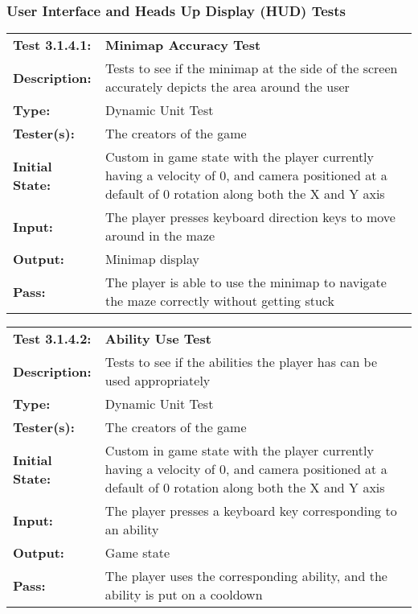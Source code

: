 \documentclass[12pt, titlepage]{article}
\begin{document}
\begin{enumerate}
\subsubsection{User Interface and Heads Up Display (HUD) Tests}
\begin{mdframed}[linewidth=1pt]
\begin{tabularx}{\textwidth}{@{}p{3cm}X@{}}
{\bf Test 3.1.4.1:} & {\bf Minimap Accuracy Test}\\[\baselineskip]
{\bf Description:} & Tests to see if the minimap at the side of the screen accurately depicts the area around the user\\[0.5\baselineskip]
{\bf Type:} & Dynamic Unit Test\\[0.5\baselineskip]
{\bf Tester(s):} & The creators of the game\\[0.5\baselineskip]
{\bf Initial State:} & Custom in game state with the player currently having a velocity of 0, and camera positioned at a default of 0 rotation along both the X and Y axis\\[0.5\baselineskip]
{\bf Input:} & The player presses keyboard direction keys to move around in the maze\\[0.5\baselineskip]
{\bf Output:} & Minimap display\\[0.5\baselineskip]
{\bf Pass:} & The player is able to use the minimap to navigate the maze correctly without getting stuck
\end{tabularx}
\end{mdframed}

\begin{mdframed}[linewidth=1pt]
\begin{tabularx}{\textwidth}{@{}p{3cm}X@{}}
{\bf Test 3.1.4.2:} & {\bf Ability Use Test}\\[\baselineskip]
{\bf Description:} & Tests to see if the abilities the player has can be used appropriately \\[0.5\baselineskip]
{\bf Type:} & Dynamic Unit Test\\[0.5\baselineskip]
{\bf Tester(s):} & The creators of the game\\[0.5\baselineskip]
{\bf Initial State:} & Custom in game state with the player currently having a velocity of 0, and camera positioned at a default of 0 rotation along both the X and Y axis\\[0.5\baselineskip]
{\bf Input:} & The player presses a keyboard key corresponding to an ability \\[0.5\baselineskip]
{\bf Output:} & Game state\\[0.5\baselineskip]
{\bf Pass:} & The player uses the corresponding ability, and the ability is put on a cooldown
\end{tabularx}
\end{mdframed}


\end{enumerate}
\end{document}
